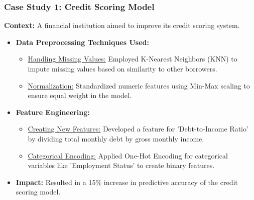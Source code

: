 \documentclass[aspectratio=169]{beamer}
\begin{document}
\begin{frame}
    \frametitle{Case Study 1: Credit Scoring Model}
    \textbf{Context:} A financial institution aimed to improve its credit scoring system.

    \begin{itemize}
        \item \textbf{Data Preprocessing Techniques Used:}
        \begin{itemize}
            \item \underline{Handling Missing Values:} Employed K-Nearest Neighbors (KNN) to impute missing values based on similarity to other borrowers.
            \item \underline{Normalization:} Standardized numeric features using Min-Max scaling to ensure equal weight in the model.
        \end{itemize}

        \item \textbf{Feature Engineering:}
        \begin{itemize}
            \item \underline{Creating New Features:} Developed a feature for 'Debt-to-Income Ratio' by dividing total monthly debt by gross monthly income.
            \item \underline{Categorical Encoding:} Applied One-Hot Encoding for categorical variables like 'Employment Status' to create binary features.
        \end{itemize}

        \item \textbf{Impact:} Resulted in a 15\% increase in predictive accuracy of the credit scoring model.
    \end{itemize}
\end{frame}
\end{document}
